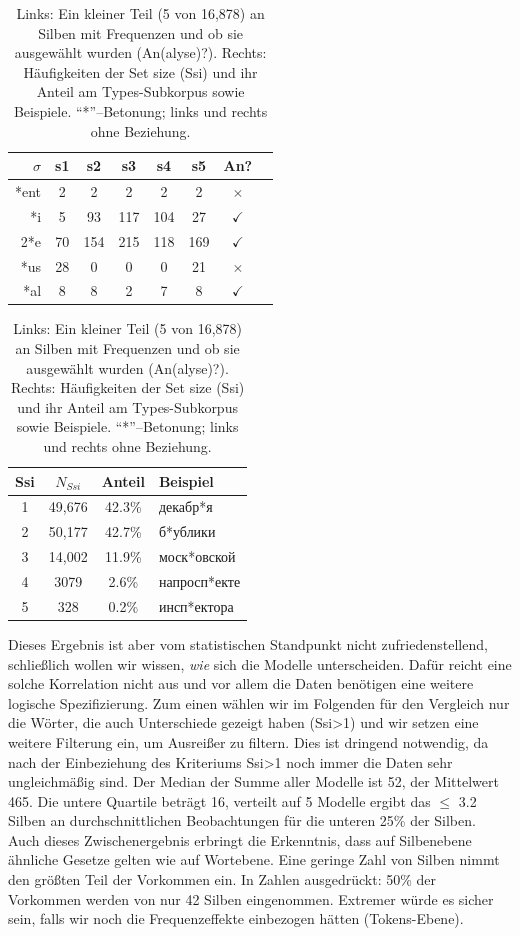 \documentclass[12pt,headsepline,a4paper]{scrartcl}
\newcommand\textcyr[1]{{\fontencoding{OT2}\fontfamily{wncyr}\selectfont #1}}
\begin{document}
 \begin{table}[htbp]
 \caption{Links: Ein kleiner Teil (5 von 16,878) an Silben mit Frequenzen und ob sie ausgewählt wurden (An(alyse)?). Rechts: Häufigkeiten der Set size (Ssi) und ihr Anteil am Types-Subkorpus sowie Beispiele. "`*"'--Betonung; links und rechts ohne Beziehung.}
 \label{tab: 10high_std}
\small
 \begin{tabular}{r|ccccccc}
 \toprule
$\sigma$ &     s1 &     s2 &     s3 &     s4 &     s5&An? \\
 \midrule
*ent   &   2    &2    &2    &2    &2 &$\times$\\
*i        &5   &93  &117  &104   &27& $\checkmark$\\
2*e      &70  &154  &215  &118  &169 &$\checkmark$\\
*us      &28  &0  &0  &0   &21& $\times$\\
*al       &8    &8    &2    &7    &8& $\checkmark$\\
 \bottomrule
 \end{tabular}
\quad
\begin{tabular}{c|ccl}
\toprule
Ssi&$N_{Ssi}$&Anteil&Beispiel\\
\midrule
1&49,676 &42.3\%& \textcyr{декабр*я}\\
2&50,177&42.7\%&\textcyr{б*ублики}\\
3&14,002&11.9\%& \textcyr{моск*овской}\\
4& 3079&2.6\%&\textcyr{напросп*екте}\\
5&328&0.2\% &\textcyr{инсп*ектора}\\
\bottomrule
\end{tabular}
 \end{table} 


Dieses Ergebnis ist aber vom statistischen Standpunkt nicht zufriedenstellend, schließlich wollen wir wissen, \textit{wie} sich die Modelle unterscheiden. Dafür reicht eine solche Korrelation nicht aus und vor allem die Daten benötigen eine weitere logische Spezifizierung. Zum einen wählen wir im Folgenden für den Vergleich nur die Wörter, die auch Unterschiede gezeigt haben (Ssi>1) und wir setzen eine weitere Filterung ein, um Ausreißer zu filtern. Dies ist dringend notwendig, da nach der Einbeziehung des Kriteriums Ssi>1 noch immer die Daten sehr ungleichmäßig sind. Der Median der Summe aller Modelle ist 52, der Mittelwert 465. Die untere Quartile beträgt 16, verteilt auf 5 Modelle ergibt das $\leq$ 3.2 Silben an durchschnittlichen Beobachtungen für die unteren 25\% der Silben. Auch dieses Zwischenergebnis erbringt die Erkenntnis, dass auf Silbenebene ähnliche Gesetze gelten wie auf Wortebene. Eine geringe Zahl von Silben nimmt den größten Teil der Vorkommen ein. In Zahlen ausgedrückt: 50\% der Vorkommen werden von nur 42 Silben eingenommen. Extremer würde es sicher sein, falls wir noch die Frequenzeffekte einbezogen hätten (Tokens-Ebene). 
\end{document}
